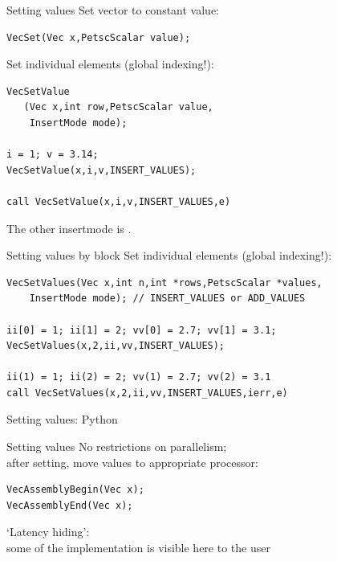\begin{numberedframe}{Setting values}
\small
Set vector to constant value:
\begin{lstlisting}
VecSet(Vec x,PetscScalar value);
\end{lstlisting}
Set individual elements (global indexing!):
\lstset{language=Fortran}
\begin{lstlisting}
VecSetValue
   (Vec x,int row,PetscScalar value,
    InsertMode mode);

i = 1; v = 3.14;
VecSetValue(x,i,v,INSERT_VALUES);

call VecSetValue(x,i,v,INSERT_VALUES,e)
\end{lstlisting}
The other insertmode is .
\end{numberedframe}

\lstset{language=C}

\begin{longstory}

\begin{numberedframe}{Setting values by block}
Set individual elements (global indexing!):
\begin{lstlisting}
VecSetValues(Vec x,int n,int *rows,PetscScalar *values,
    InsertMode mode); // INSERT_VALUES or ADD_VALUES

ii[0] = 1; ii[1] = 2; vv[0] = 2.7; vv[1] = 3.1;
VecSetValues(x,2,ii,vv,INSERT_VALUES);

ii(1) = 1; ii(2) = 2; vv(1) = 2.7; vv(2) = 3.1
call VecSetValues(x,2,ii,vv,INSERT_VALUES,ierr,e)
\end{lstlisting}
\end{numberedframe}

\begin{python}
\begin{numberedframe}{Setting values: Python}
\end{numberedframe}
\end{python}

\begin{numberedframe}{Setting values}
No restrictions on parallelism;\\
after setting, move values to appropriate processor:
\begin{lstlisting}
VecAssemblyBegin(Vec x);
VecAssemblyEnd(Vec x);
\end{lstlisting}
`Latency hiding':\\
some of the implementation is visible here
to the user
\end{numberedframe}

\end{longstory}

